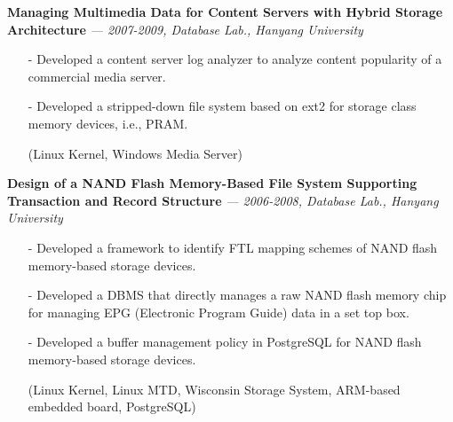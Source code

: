   \vspace{-0.15in}
  {\bf Managing Multimedia Data for Content Servers with Hybrid Storage Architecture}
    {\it \footnotesize --- 2007-2009, Database Lab., Hanyang University}
    \begin{itemize}[leftmargin=*]
    \setlength\itemsep{-0.02in}
    \item[-] Developed a content server log analyzer to analyze content popularity
             of a commercial media server.
    \item[-] Developed a stripped-down file system based on ext2
             for storage class memory devices, i.e., PRAM.
    \item[] {\small(Linux Kernel, Windows Media Server)}
    \end{itemize}
  \vspace{-0.15in}
  {\bf Design of a NAND Flash Memory-Based File System Supporting Transaction and
      Record Structure} 
    {\it \footnotesize --- 2006-2008, Database Lab., Hanyang University}
    \begin{itemize}[leftmargin=*]
    \setlength\itemsep{-0.02in}
    \item[-] Developed a framework to identify FTL mapping schemes of NAND flash memory-based
             storage devices.
    \item[-] Developed a DBMS that directly manages a raw NAND flash memory chip
             for managing EPG (Electronic Program Guide) data in a set top box.
    \item[-] Developed a buffer management policy in PostgreSQL for NAND flash
             memory-based storage devices.
    \item[] {\small(Linux Kernel, Linux MTD, Wisconsin Storage System, ARM-based embedded
     board, PostgreSQL)}
    \end{itemize}

